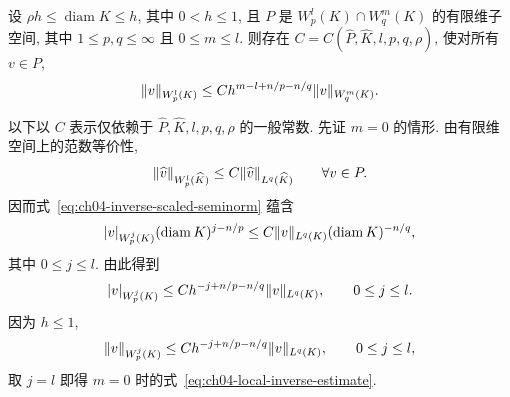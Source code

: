 \setcounter{thmcount}{2}
\begin{Lemma}
\label{lem:ch04-local-inverse-estimate}
设 $\rho h\leq\operatorname{diam}K\leq h$, 其中 $0<h\leq1$, 且 $P$ 是 $W_p^l(K)\cap W_q^m(K)$ 的有限维子空间, 其中 $1\leq p,q\leq\infty$ 且 $0\leq m\leq l$. 则存在 $C=C(\widehat P,\widehat K,l,p,q,\rho)$, 使对所有 $v\in P$,
\begin{equation}
\MathBookFormulaID{formula-ch04-local-inverse-estimate}
\label{eq:ch04-local-inverse-estimate}
\|v\|_{W_p^l(K)}
\leq Ch^{m-l+n/p-n/q}\|v\|_{W_q^m(K)}.
\end{equation}
\end{Lemma}
\begin{Proof}
以下以 $C$ 表示仅依赖于 $\widehat P,\widehat K,l,p,q,\rho$ 的一般常数. 先证 $m=0$ 的情形. 由有限维空间上的范数等价性,
\begin{equation}
\MathBookFormulaID{formula-ch04-normalized-norm-equivalence}
\label{eq:ch04-normalized-norm-equivalence}
\|\widehat v\|_{W_p^l(\widehat K)}
\leq C\|\widehat v\|_{L^q(\widehat K)}
\qquad\forall v\in P.
\end{equation}
因而式~\eqref{eq:ch04-inverse-scaled-seminorm} 蕴含
\begin{equation}
\MathBookFormulaID{formula-ch04-inverse-scaled-component-estimate}
\label{eq:ch04-inverse-scaled-component-estimate}
|v|_{W_p^j(K)}(\operatorname{diam}K)^{j-n/p}
\leq C\|v\|_{L^q(K)}(\operatorname{diam}K)^{-n/q},
\end{equation}
其中 $0\leq j\leq l$. 由此得到
\begin{equation}
\MathBookFormulaID{formula-ch04-inverse-component-estimate}
\label{eq:ch04-inverse-component-estimate}
|v|_{W_p^j(K)}
\leq Ch^{-j+n/p-n/q}\|v\|_{L^q(K)},
\qquad0\leq j\leq l.
\end{equation}
因为 $h\leq1$,
\begin{equation}
\MathBookFormulaID{formula-ch04-inverse-full-norm-estimate}
\label{eq:ch04-inverse-full-norm-estimate}
\|v\|_{W_p^j(K)}
\leq Ch^{-j+n/p-n/q}\|v\|_{L^q(K)},
\qquad0\leq j\leq l,
\end{equation}
取 $j=l$ 即得 $m=0$ 时的式~\eqref{eq:ch04-local-inverse-estimate}.


\end{Proof}
